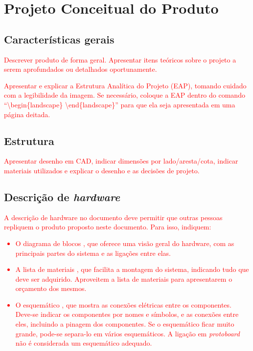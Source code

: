 \chapter{Projeto Conceitual do Produto}

\section{Características gerais}

\textcolor{red}{Descrever produto de forma geral. Apresentar itens teóricos sobre o projeto a serem aprofundados ou detalhados oportunamente.}

\textcolor{red}{Apresentar e explicar a Estrutura Analítica do Projeto (EAP), tomando cuidado com a legibilidade da imagem. Se necessário, coloque a EAP dentro do comando ``\textsf{\textbackslash begin\{landscape\} \textbackslash end\{landscape\}}'' para que ela seja apresentada em uma página deitada.}

\section{Estrutura}

\textcolor{red}{Apresentar desenho em CAD, indicar dimensões por lado/aresta/cota, indicar materiais utilizados e explicar o desenho e as decisões de projeto.}

\section{Descrição de \textit{hardware}}

\textcolor{red}{A descrição de hardware no documento deve permitir que outras pessoas repliquem o produto proposto neste documento. Para isso, indiquem:}

\textcolor{red}{\begin{itemize}
    \item O diagrama de blocos \cite{blockdiagram}, que oferece uma visão geral do hardware, com as principais partes do sistema e as ligações entre elas.
    \item A lista de materiais \cite{bom}, que facilita a montagem do sistema, indicando tudo que deve ser adquirido. Aproveitem a lista de materiais para apresentarem o orçamento dos mesmos.
    \item O esquemático \cite{esquematico}, que mostra as conexões elétricas entre os componentes. Deve-se indicar os componentes por nomes e símbolos, e as conexões entre eles, incluindo a pinagem dos componentes. Se o esquemático ficar muito grande, pode-se separa-lo em vários esquemáticos. A ligação em \textit{protoboard} não é considerada um esquemático adequado.
\end{itemize}}

